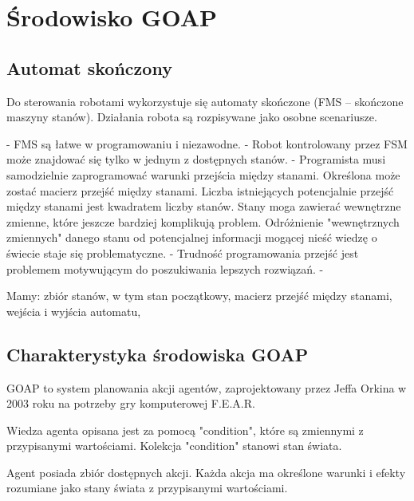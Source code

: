 \chapter{Środowisko GOAP}

\section{Automat skończony}

Do sterowania robotami wykorzystuje się automaty skończone (FMS – skończone maszyny stanów). Działania robota są rozpisywane jako osobne scenariusze. 

- FMS są łatwe w programowaniu i niezawodne.
- Robot kontrolowany przez FSM może znajdować się tylko w jednym z dostępnych stanów.
- Programista musi samodzielnie zaprogramować warunki przejścia między stanami. Określona może zostać macierz przejść między stanami. Liczba istniejących potencjalnie przejść między stanami jest kwadratem liczby stanów. Stany moga zawierać wewnętrzne zmienne, które jeszcze bardziej komplikują problem. Odróżnienie "wewnętrznych zmiennych" danego stanu od potencjalnej informacji mogącej nieść wiedzę o świecie staje się problematyczne.
- Trudność programowania przejść jest problemem motywującym do poszukiwania lepszych rozwiązań.
- 

Mamy: zbiór stanów, w tym stan początkowy, macierz przejść między stanami, wejścia i wyjścia automatu,

\section{Charakterystyka środowiska GOAP}


GOAP to system planowania akcji agentów, zaprojektowany przez Jeffa Orkina w 2003 roku na potrzeby gry komputerowej F.E.A.R.

Wiedza agenta opisana jest za pomocą "condition", które są zmiennymi z przypisanymi wartościami. Kolekcja "condition" stanowi stan świata. %

Agent posiada zbiór dostępnych akcji. Każda akcja ma określone warunki i efekty rozumiane jako stany świata z przypisanymi wartościami. 

